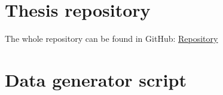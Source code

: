 \documentclass[english, 12pt, a4paper, sci, utf8, a-2b, online]{aaltothesis}
\theoremstyle{change}
\theoremstyle{theoremstyle}
\begin{document}
\clearpage




\thesisappendix
\section{Thesis repository}
The whole repository can be found in GitHub: \href{https://github.com/balintpragai/elte_aalto_thesis}{Repository}
\section{Data generator script}\label{code:datagen}
\end{document}
